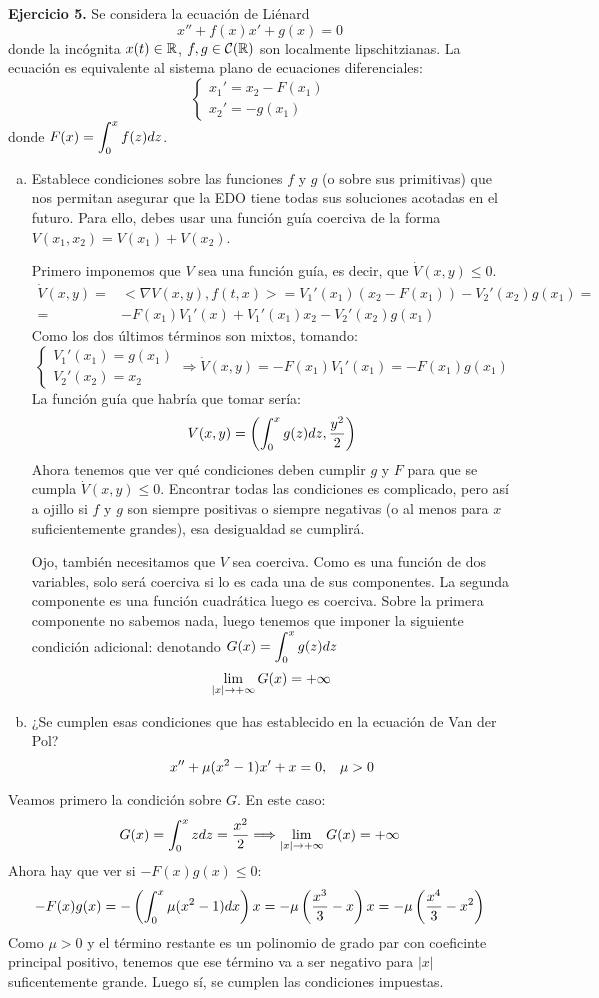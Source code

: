 \documentclass[12pt]{article}
\theoremstyle{definition}
\theoremstyle{remark}
\begin{document}
\textbf{Ejercicio 5.} Se considera la ecuación de Liénard
\[
x''+f(x)x'+g(x)=0
\]
donde la incógnita $x(t)\in\mathbb{R}$, $f,g\in\mathcal{C}(\mathbb{R})$ son localmente lipschitzianas. La ecuación es equivalente al sistema plano de ecuaciones diferenciales:
\[
\left\{
\begin{array}{l}
x_1'=x_2-F(x_1)\\
x_2'=-g(x_1)
\end{array}
\right.
\]
donde $F(x)=\displaystyle\int_{ 0 }^{ x } f(z)dz$.
\begin{enumerate}[(a)]
\item Establece condiciones sobre las funciones $f$ y $g$ (o sobre sus primitivas) que nos permitan asegurar que la EDO tiene todas sus soluciones acotadas en el futuro. Para ello, debes usar una función guía coerciva de la forma $V(x_1,x_2)=V(x_1)+V(x_2)$.

Primero imponemos que $V$ sea una función guía, es decir, que $\dot{V}(x,y)\leq 0$.
\[
\begin{array}{rl}
\dot{V}(x,y)= & <\nabla V(x,y), f(t,x)>=V_1'(x_1)(x_2-F(x_1))-V_2'(x_2)g(x_1)=\\
=& -F(x_1)V_1'(x)+V_1'(x_1)x_2-V_2'(x_2)g(x_1)
\end{array}
\]
Como los dos últimos términos son mixtos, tomando:
\[
\left\{
\begin{array}{l}
V_1'(x_1)=g(x_1)\\
V_2'(x_2)=x_2
\end{array} \Rightarrow \dot{V}(x,y)=-F(x_1)V_1'(x_1)=-F(x_1)g(x_1)
\right.
\]
La función  guía que habría que tomar sería:
\[
V(x,y)=\left(\displaystyle\int_{ 0 }^{ x } g(z)dz,\frac{y^2}{2}\right)
\]
Ahora tenemos que ver qué condiciones deben cumplir $g$ y $F$ para que se cumpla $\dot{V}(x,y)\leq 0$. Encontrar todas las condiciones es complicado, pero así a ojillo si $f$ y $g$ son siempre positivas o siempre negativas (o al menos para $x$ suficientemente grandes), esa desigualdad se cumplirá.

Ojo, también necesitamos que $V$ sea coerciva. Como es una función de dos variables, solo será coerciva si lo es cada una de sus componentes. La segunda componente es una función cuadrática luego es coerciva. Sobre la primera componente no sabemos nada, luego tenemos que imponer la siguiente condición adicional: denotando $G(x)=\displaystyle\int_{ 0 }^{ x } g(z)dz$
\[
\displaystyle\lim_{  |x|  \to +\infty }  G(x) =+\infty
\]
\item ¿Se cumplen esas condiciones que has establecido en la ecuación de Van der Pol?
\[
x''+\mu(x^2-1)x'+x=0, \;\;\; \mu > 0
\]
\end{enumerate}

Veamos primero la condición sobre $G$. En este caso:
\[
G(x)=\displaystyle\int_{ 0 }^{ x } zdz=\frac{x^2}{2} \Longrightarrow \displaystyle\lim_{  |x|  \to +\infty }  G(x) =+\infty
\]
Ahora hay que ver si $-F(x)g(x)\leq 0$:
\[
-F(x)g(x)=-\left(\displaystyle\int_{ 0 }^{ x } \mu(x^2-1)dx\right)x=-\mu\left(\frac{x^3}{3}-x\right)x=-\mu\left(\frac{x^4}{3}-x^2\right)
\]
Como $\mu>0$ y el término restante es un polinomio de grado par con coeficinte principal positivo, tenemos que ese término va a ser negativo para $|x|$ suficentemente grande. Luego sí, se cumplen las condiciones impuestas.
\end{document}
